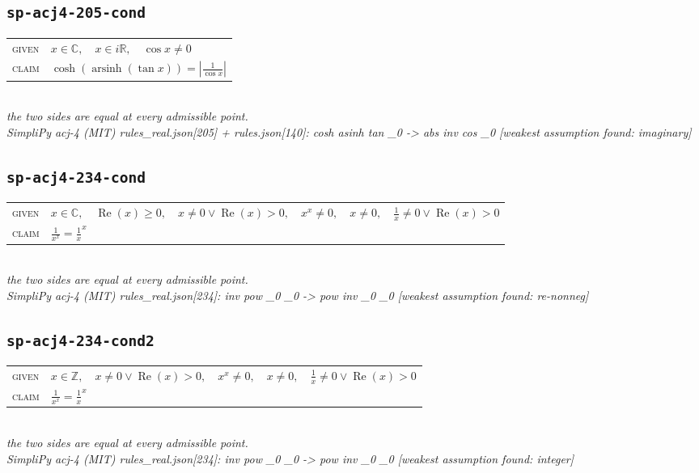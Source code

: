 \documentclass[11pt]{article}
\begin{document}
\subsection*{\texttt{sp-acj4-205-cond}}
\begin{tabular}{@{}l@{\quad}l@{}}
\textsc{given} & $x \in \mathbb{C},\quad x \in i\mathbb{R},\quad \cos x \neq 0$ \\[4pt]
\textsc{claim} & $\displaystyle \cosh\left(\operatorname{arsinh}\left(\tan x\right)\right) = \left|\frac{1}{\cos x}\right|$ \\
\end{tabular}\\[2pt]
{\small\emph{the two sides are equal at every admissible point.}}\\
\emph{SimpliPy acj-4 (MIT) rules\_real.json[205] + rules.json[140]: cosh asinh tan \_0  ->  abs inv cos \_0  [weakest assumption found: imaginary]}\\

\subsection*{\texttt{sp-acj4-234-cond}}
\begin{tabular}{@{}l@{\quad}l@{}}
\textsc{given} & $x \in \mathbb{C},\quad \operatorname{Re}\left(x\right) \ge 0,\quad x \neq 0 \lor \operatorname{Re}\left(x\right) > 0,\quad x^{x} \neq 0,\quad x \neq 0,\quad \frac{1}{x} \neq 0 \lor \operatorname{Re}\left(x\right) > 0$ \\[4pt]
\textsc{claim} & $\displaystyle \frac{1}{x^{x}} = \frac{1}{x}^{x}$ \\
\end{tabular}\\[2pt]
{\small\emph{the two sides are equal at every admissible point.}}\\
\emph{SimpliPy acj-4 (MIT) rules\_real.json[234]: inv pow \_0 \_0  ->  pow inv \_0 \_0  [weakest assumption found: re-nonneg]}\\

\subsection*{\texttt{sp-acj4-234-cond2}}
\begin{tabular}{@{}l@{\quad}l@{}}
\textsc{given} & $x \in \mathbb{Z},\quad x \neq 0 \lor \operatorname{Re}\left(x\right) > 0,\quad x^{x} \neq 0,\quad x \neq 0,\quad \frac{1}{x} \neq 0 \lor \operatorname{Re}\left(x\right) > 0$ \\[4pt]
\textsc{claim} & $\displaystyle \frac{1}{x^{x}} = \frac{1}{x}^{x}$ \\
\end{tabular}\\[2pt]
{\small\emph{the two sides are equal at every admissible point.}}\\
\emph{SimpliPy acj-4 (MIT) rules\_real.json[234]: inv pow \_0 \_0  ->  pow inv \_0 \_0  [weakest assumption found: integer]}\\
\end{document}
